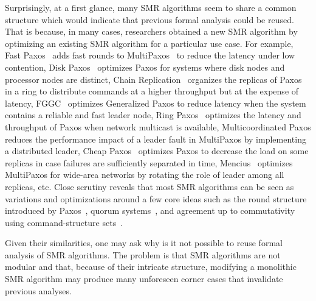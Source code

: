 Surprisingly, at a first glance, many SMR algorithms seem to share a
common structure which would indicate that previous formal analysis could
be reused. That is because, in many cases, researchers obtained a new SMR
algorithm by optimizing an existing SMR algorithm for a particular use
case. For example, Fast Paxos~\cite{Lamport06FastPaxos} adds fast rounds
to MultiPaxos~\cite{lamport2001paxos} to reduce the latency under low
contention, Disk Paxos~\cite{GafniLamport03DiskPaxos} optimizes Paxos
for systems where disk nodes and processor nodes are distinct, Chain
Replication~\cite{RenesseSchneider04ChainReplicationSupportingHighThroughputAvailability} 
organizes the replicas of Paxos in a ring to distribute
commands at a higher throughput but at the expense of latency,
FGGC~\cite{SutraShapiro11FastGenuineGeneralizedConsensus} optimizes
Generalized Paxos\cite{Lamport05GeneralizeConsensus} to reduce latency
when the system contains a reliable and fast leader node, Ring
Paxos~\cite{MarandiETAL10RingPaxosHighthroughputAtomicBroadcastProtocol}
optimizes the latency and throughput of Paxos when network multicast is
available, Multicoordinated Paxos reduces the performance impact of a
leader fault in MultiPaxos by implementing a distributed leader, Cheap
Paxos~\cite{LamportMassa04CheapPaxos} optimizes Paxos to decrease the load
on some replicas in case failures are sufficiently separated in time,
Mencius~\cite{MaoJunqueiraMarzullo08MenciusBuildingEfficientReplicatedStateMachine} 
optimizes MultiPaxos for wide-area networks by rotating the role of leader
among all replicas, etc. Close scrutiny reveals that most SMR algorithms can
be seen as variations and optimizations around a few core ideas such as the
round structure introduced by Paxos~\cite{Lamport98ParttimeParliament}, quorum
systems~\cite{GuerraouiVukolic10RefinedQuorumSystems,Lamport06FastPaxos},
and agreement up to commutativity using command-structure
sets~\cite{Lamport05GeneralizeConsensus}.

Given their similarities, one may ask why is it not possible to reuse formal
analysis of SMR algorithms. The problem is that SMR algorithms are not modular
and that, because of their intricate structure, modifying a monolithic SMR
algorithm may produce many unforeseen corner cases that invalidate previous
analyses.

